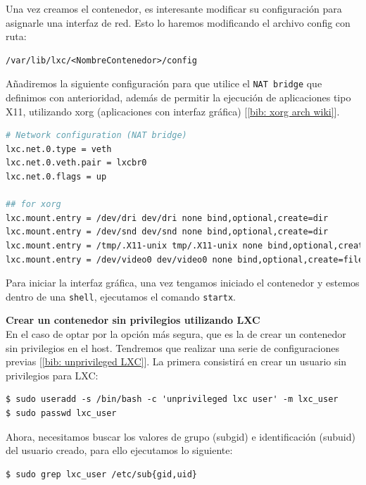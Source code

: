\documentclass[a4paper, oneside, 12pt]{book}
\begin{document}
	\pagebreak
	
	\noindent Una vez creamos el contenedor, es interesante modificar su configuración para asignarle una interfaz de red. Esto lo haremos modificando el archivo config con ruta: 
	\begin{verbatim}
/var/lib/lxc/<NombreContenedor>/config
	\end{verbatim}
	\noindent Añadiremos la siguiente configuración para que utilice el \texttt{NAT bridge} que definimos con anterioridad, además de permitir la ejecución de aplicaciones tipo X11, utilizando xorg (aplicaciones con interfaz gráfica) [\ref{bib: xorg arch wiki}].
	\begin{lstlisting}[language=Bash, caption={Configuración interfaz NAT bridge y aplicaciones X a un contenedor LXC}]
# Network configuration (NAT bridge)
lxc.net.0.type = veth
lxc.net.0.veth.pair = lxcbr0
lxc.net.0.flags = up

## for xorg
lxc.mount.entry = /dev/dri dev/dri none bind,optional,create=dir
lxc.mount.entry = /dev/snd dev/snd none bind,optional,create=dir
lxc.mount.entry = /tmp/.X11-unix tmp/.X11-unix none bind,optional,create=dir,ro
lxc.mount.entry = /dev/video0 dev/video0 none bind,optional,create=file
	\end{lstlisting}

	\noindent Para iniciar la interfaz gráfica, una vez tengamos iniciado el contenedor y estemos dentro de una \texttt{shell}, ejecutamos el comando \texttt{startx}.

	\vspace{20px}

	\noindent \textbf{\large Crear un contenedor sin privilegios utilizando LXC}\\
	
	\noindent En el caso de optar por la opción más segura, que es la de crear un contenedor sin privilegios en el host. Tendremos que realizar una serie de configuraciones previas [\ref{bib: unprivileged LXC}]. La primera consistirá en crear un usuario sin privilegios para LXC:
	\begin{verbatim}
$ sudo useradd -s /bin/bash -c 'unprivileged lxc user' -m lxc_user
$ sudo passwd lxc_user
	\end{verbatim}

	\noindent Ahora, necesitamos buscar los valores de grupo (subgid) e identificación (subuid) del usuario creado, para ello ejecutamos lo siguiente:
	\begin{verbatim}
$ sudo grep lxc_user /etc/sub{gid,uid}
	\end{verbatim}
\end{document}

